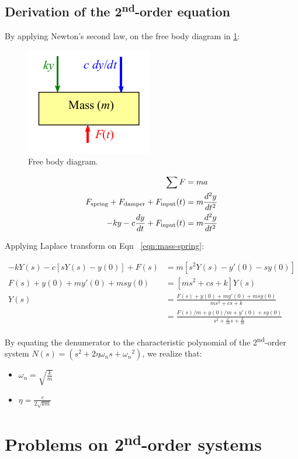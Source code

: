 \documentclass[a4paper,11pt,dvipsnames]{book}
\begin{document}
\subsection*{Derivation of the 2\textsuperscript{nd}-order equation}

By applying Newton's second law, on the free body diagram in \ref{fig:freebody}:

\begin{figure}[h!]\label{fig:freebody}
\centering
  \includegraphics[width=0.3\linewidth]{newton}
  \caption{Free body diagram.} 
\end{figure}

\begin{align}
\sum F &= m a \\ 
F_{\rm spring} + F_{\rm damper} + F_{\rm input}(t) &= m \frac{d^2y}{dt^2} \\ 
-ky -c \frac{dy}{dt} + F_{\rm input}(t) &= m \frac{d^2y}{dt^2} \label{eqn:mass-spring}
\end{align}

Applying Laplace transform on Eqn ~\ref{eqn:mass-spring}:

\begin{align*}
-kY(s) - c\left[sY(s)-y(0)\right] + F(s) &= m\left[s^2Y(s)-y'(0)-sy(0)\right] \\
F(s) + y(0) + my'(0)+msy(0) &= \left[ms^2+cs+k\right]Y(s) \\
Y(s) &= \frac{F(s) + y(0) + my'(0)+msy(0)}{ms^2+cs+k} \\
&= \frac{F(s)/m + y(0)/m + y'(0)+sy(0)}{s^2+\frac{c}{m}s+ \frac{k}{m}}
\end{align*}

By equating the denumerator to the characteristic polynomial of the 2\textsuperscript{nd}-order system $N(s)=(s^2 + 2 \eta \omega_n s + {\omega_n}^2)$, we realize that:
\begin{itemize}
\item $\omega_n=\sqrt{\frac{k}{m}}$
\item $\eta = \frac{c}{2\sqrt{km}}$
\end{itemize} 



\section*{Problems on 2\textsuperscript{nd}-order systems}
\end{document}
